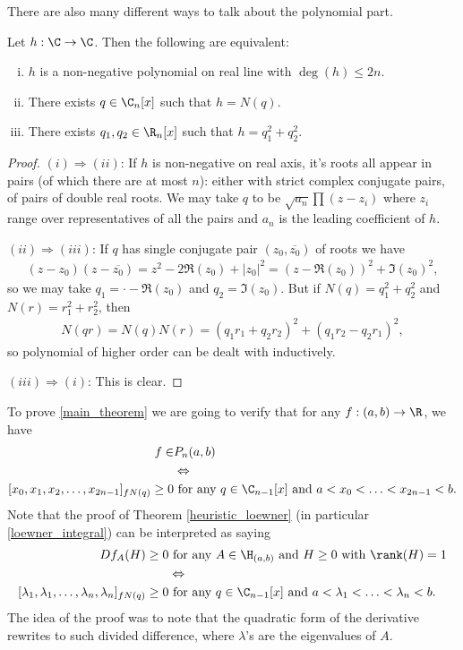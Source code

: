 There are also many different ways to talk about the polynomial part.
\begin{lem}\label{polynomial_lemma}
	Let $h : \C \to \C$. Then the following are equivalent:
	\begin{enumerate}[(i)]
		\item $h$ is a non-negative polynomial on real line with  $\deg(h) \leq 2 n$.
		\item There exists $q \in \C_{n}[x]$ such that $h = N(q)$.
		\item There exists $q_{1}, q_{2} \in \R_{n}[x]$ such that $h = q_{1}^2 + q_{2}^2$.
	\end{enumerate}
\end{lem}
\begin{proof}
	$(i) \Rightarrow (ii)$: If $h$ is non-negative on real axis, it's roots all appear in pairs (of which there are at most $n$): either with strict complex conjugate pairs, of pairs of double real roots. We may take $q$ to be $\sqrt{a_{n}}\prod (z - z_{i})$ where $z_{i}$ range over representatives of all the pairs and $a_{n}$ is the leading coefficient of $h$.

	$(ii) \Rightarrow (iii)$: If $q$ has single conjugate pair $(z_{0}, \overline{z_{0}})$ of roots we have
	\begin{align*}
		(z - z_{0}) (z - \overline{z_{0}}) = z^2 - 2 \Re(z_{0}) + |z_{0}|^2 = (z - \Re(z_{0}))^2 + \Im(z_{0})^2,
	\end{align*}
	so we may take $q_{1} = \cdot - \Re(z_{0})$ and $q_{2} = \Im(z_{0})$. But if $ N(q) = q_{1}^2 + q_{2}^2$ and $ N(r) = r_{1}^2 + r_{2}^2$, then
	\begin{align*}
		N(q r) = N(q) N(r) = (q_{1} r_{1} + q_{2} r_{2})^2 + (q_{1} r_{2} - q_{2} r_{1})^2,
	\end{align*}
	so polynomial of higher order can be dealt with inductively.

	$(iii) \Rightarrow (i)$: This is clear.
\end{proof}

To prove \ref{main_theorem} we are going to verify that for any $f : (a, b) \to \R$, we have 
\begin{align*}
	f \in & P_{n}(a, b) \\
	&\Leftrightarrow \\
	[x_{0}, x_{1}, x_{2}, \ldots, x_{2 n - 1}]_{f N(q)} \geq 0 &\text{ for any $q \in \C_{n - 1}[x]$ and $a < x_{0} < \ldots < x_{2 n - 1} < b$}.
\end{align*}
Note that the proof of Theorem \ref{heuristic_loewner} (in particular \ref{loewner_integral}) can be interpreted as saying
\begin{align*}
	D f_{A}(H) \geq 0 &\text{ for any $A \in \H_{(a, b)}$ and $H \geq 0$ with $\rank(H) = 1$} \\
	&\Leftrightarrow \\
	[\lambda_{1}, \lambda_{1}, \ldots, \lambda_{n}, \lambda_{n}]_{f N(q)} \geq 0 &\text{ for any $q \in \C_{n - 1}[x]$ and $a < \lambda_{1} < \ldots < \lambda_{n} < b$}.
\end{align*}
The idea of the proof was to note that the quadratic form of the derivative rewrites to such divided difference, where $\lambda$'s are the eigenvalues of $A$.

